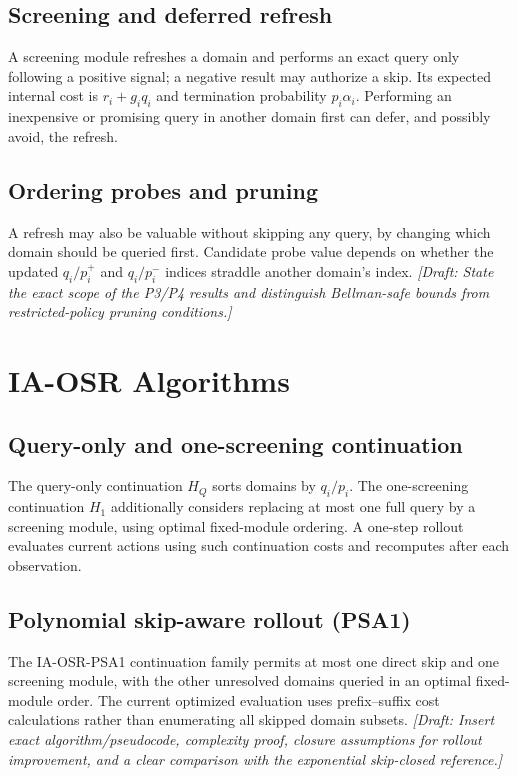 \documentclass[conference]{IEEEtran}
\newcommand{\TODO}[1]{\textit{[Draft: #1]}}
\begin{document}
\subsection{Screening and deferred refresh}
A screening module refreshes a domain and performs an exact query only
following a positive signal; a negative result may authorize a skip.
Its expected internal cost is $r_i+g_iq_i$ and termination probability
$p_i\alpha_i$. Performing an inexpensive or promising query in another
domain first can defer, and possibly avoid, the refresh.

\subsection{Ordering probes and pruning}
A refresh may also be valuable without skipping any query, by changing
which domain should be queried first. Candidate probe value depends on
whether the updated $q_i/p_i^{+}$ and $q_i/p_i^{-}$ indices straddle
another domain's index. \TODO{State the exact scope of the P3/P4
results and distinguish Bellman-safe bounds from restricted-policy
pruning conditions.}

\section{IA-OSR Algorithms}
\label{sec:algorithms}
\subsection{Query-only and one-screening continuation}
The query-only continuation $H_Q$ sorts domains by $q_i/p_i$.
The one-screening continuation $H_1$ additionally considers replacing
at most one full query by a screening module, using optimal fixed-module
ordering. A one-step rollout evaluates current actions using such
continuation costs and recomputes after each observation.

\subsection{Polynomial skip-aware rollout (PSA1)}
The IA-OSR-PSA1 continuation family permits at most one direct skip and
one screening module, with the other unresolved domains queried in an
optimal fixed-module order. The current optimized evaluation uses
prefix--suffix cost calculations rather than enumerating all skipped
domain subsets. \TODO{Insert exact algorithm/pseudocode, complexity proof,
closure assumptions for rollout improvement, and a clear comparison
with the exponential skip-closed reference.}
\end{document}
